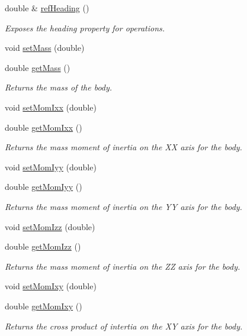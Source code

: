 \begin{DoxyCompactItemize}
double \& \hyperlink{class_body_a7aef7cce12d2dbdd3e5ab789ba8fe669}{ref\-Heading} ()
\begin{DoxyCompactList}\small\item\em Exposes the heading property for operations. \end{DoxyCompactList}\item 
void \hyperlink{class_body_a896b660a9d001422f5d2b0b4e6d77b98}{set\-Mass} (double)
\item 
double \hyperlink{class_body_ac58abb2931cc56f2c0ff85700175a4d9}{get\-Mass} ()
\begin{DoxyCompactList}\small\item\em Returns the mass of the body. \end{DoxyCompactList}\item 
void \hyperlink{class_body_a2c9b1a384512fdd3fc5bb017289d1478}{set\-Mom\-Ixx} (double)
\item 
double \hyperlink{class_body_ac95aca5c89a30c42db96a8cfacecd89d}{get\-Mom\-Ixx} ()
\begin{DoxyCompactList}\small\item\em Returns the mass moment of inertia on the X\-X axis for the body. \end{DoxyCompactList}\item 
void \hyperlink{class_body_a4a92bccc2f40ba7d5fe754428d41195f}{set\-Mom\-Iyy} (double)
\item 
double \hyperlink{class_body_ade00f804ca3c40245527f5554580f331}{get\-Mom\-Iyy} ()
\begin{DoxyCompactList}\small\item\em Returns the mass moment of inertia on the Y\-Y axis for the body. \end{DoxyCompactList}\item 
void \hyperlink{class_body_a99662066111dcde2dd6fdbf8dd2230dd}{set\-Mom\-Izz} (double)
\item 
double \hyperlink{class_body_a00f9b6c0dfc59de42bb4ba6eaa80d707}{get\-Mom\-Izz} ()
\begin{DoxyCompactList}\small\item\em Returns the mass moment of inertia on the Z\-Z axis for the body. \end{DoxyCompactList}\item 
void \hyperlink{class_body_ad21041419756e97484ef399181e4b668}{set\-Mom\-Ixy} (double)
\item 
double \hyperlink{class_body_a1acaae4a9731de146aabcb9482ff3f0b}{get\-Mom\-Ixy} ()
\begin{DoxyCompactList}\small\item\em Returns the cross product of intertia on the X\-Y axis for the body. \end{DoxyCompactList}\item 

\end{DoxyCompactItemize}
